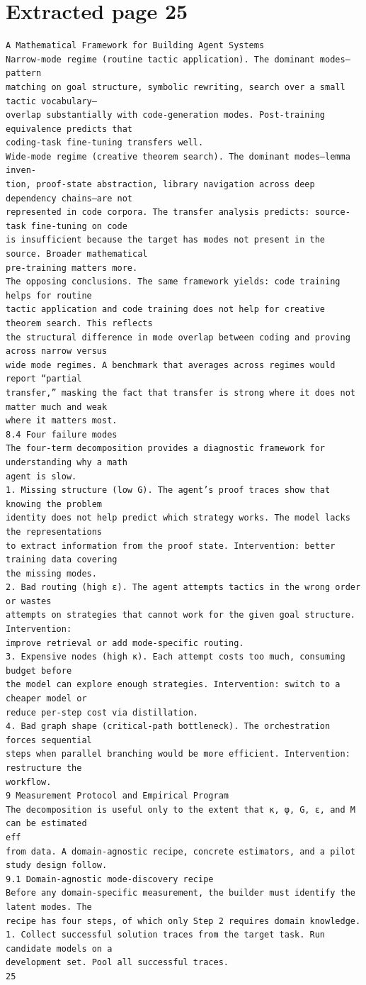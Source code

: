 \documentclass[11pt]{article}
\begin{document}
\clearpage
\section*{Extracted page 25}
\begin{verbatim}
A Mathematical Framework for Building Agent Systems
Narrow-mode regime (routine tactic application). The dominant modes—pattern
matching on goal structure, symbolic rewriting, search over a small tactic vocabulary—
overlap substantially with code-generation modes. Post-training equivalence predicts that
coding-task fine-tuning transfers well.
Wide-mode regime (creative theorem search). The dominant modes—lemma inven-
tion, proof-state abstraction, library navigation across deep dependency chains—are not
represented in code corpora. The transfer analysis predicts: source-task fine-tuning on code
is insufficient because the target has modes not present in the source. Broader mathematical
pre-training matters more.
The opposing conclusions. The same framework yields: code training helps for routine
tactic application and code training does not help for creative theorem search. This reflects
the structural difference in mode overlap between coding and proving across narrow versus
wide mode regimes. A benchmark that averages across regimes would report “partial
transfer,” masking the fact that transfer is strong where it does not matter much and weak
where it matters most.
8.4 Four failure modes
The four-term decomposition provides a diagnostic framework for understanding why a math
agent is slow.
1. Missing structure (low G). The agent’s proof traces show that knowing the problem
identity does not help predict which strategy works. The model lacks the representations
to extract information from the proof state. Intervention: better training data covering
the missing modes.
2. Bad routing (high ε). The agent attempts tactics in the wrong order or wastes
attempts on strategies that cannot work for the given goal structure. Intervention:
improve retrieval or add mode-specific routing.
3. Expensive nodes (high κ). Each attempt costs too much, consuming budget before
the model can explore enough strategies. Intervention: switch to a cheaper model or
reduce per-step cost via distillation.
4. Bad graph shape (critical-path bottleneck). The orchestration forces sequential
steps when parallel branching would be more efficient. Intervention: restructure the
workflow.
9 Measurement Protocol and Empirical Program
The decomposition is useful only to the extent that κ, φ, G, ε, and M can be estimated
eff
from data. A domain-agnostic recipe, concrete estimators, and a pilot study design follow.
9.1 Domain-agnostic mode-discovery recipe
Before any domain-specific measurement, the builder must identify the latent modes. The
recipe has four steps, of which only Step 2 requires domain knowledge.
1. Collect successful solution traces from the target task. Run candidate models on a
development set. Pool all successful traces.
25
\end{verbatim}
\end{document}
